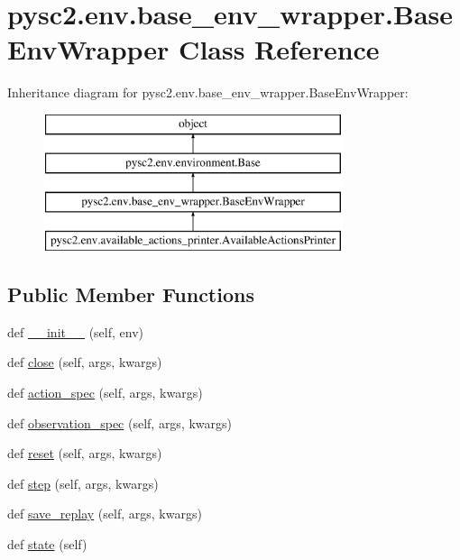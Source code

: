 \hypertarget{classpysc2_1_1env_1_1base__env__wrapper_1_1_base_env_wrapper}{}\section{pysc2.\+env.\+base\+\_\+env\+\_\+wrapper.\+Base\+Env\+Wrapper Class Reference}
\label{classpysc2_1_1env_1_1base__env__wrapper_1_1_base_env_wrapper}
Inheritance diagram for pysc2.\+env.\+base\+\_\+env\+\_\+wrapper.\+Base\+Env\+Wrapper\+:\begin{figure}[H]
\begin{center}
\leavevmode
\includegraphics[height=4.000000cm]{classpysc2_1_1env_1_1base__env__wrapper_1_1_base_env_wrapper}
\end{center}
\end{figure}
\subsection*{Public Member Functions}
\begin{DoxyCompactItemize}
\item 
def \mbox{\hyperlink{classpysc2_1_1env_1_1base__env__wrapper_1_1_base_env_wrapper_a559e7740680ee3bea19dad409eaba8e6}{\+\_\+\+\_\+init\+\_\+\+\_\+}} (self, env)
\item 
def \mbox{\hyperlink{classpysc2_1_1env_1_1base__env__wrapper_1_1_base_env_wrapper_a7c67bf47a58d4ca0857fbca0664842b0}{close}} (self, args, kwargs)
\item 
def \mbox{\hyperlink{classpysc2_1_1env_1_1base__env__wrapper_1_1_base_env_wrapper_aceb8c9f065aac5de979d8b9fe2dde82b}{action\+\_\+spec}} (self, args, kwargs)
\item 
def \mbox{\hyperlink{classpysc2_1_1env_1_1base__env__wrapper_1_1_base_env_wrapper_a1b4fec660232a73e8985d96f77b30ec3}{observation\+\_\+spec}} (self, args, kwargs)
\item 
def \mbox{\hyperlink{classpysc2_1_1env_1_1base__env__wrapper_1_1_base_env_wrapper_a6b528f10880414b3adbf2d55cf25d48b}{reset}} (self, args, kwargs)
\item 
def \mbox{\hyperlink{classpysc2_1_1env_1_1base__env__wrapper_1_1_base_env_wrapper_ab491e6f3a60fb773ba3573ebbd49cfc5}{step}} (self, args, kwargs)
\item 
def \mbox{\hyperlink{classpysc2_1_1env_1_1base__env__wrapper_1_1_base_env_wrapper_a60cf932110b1a4ec35d36c719ae8b045}{save\+\_\+replay}} (self, args, kwargs)
\item 
def \mbox{\hyperlink{classpysc2_1_1env_1_1base__env__wrapper_1_1_base_env_wrapper_a8b4ada1faebd56dfdc44640b74078e91}{state}} (self)
\end{DoxyCompactItemize}


